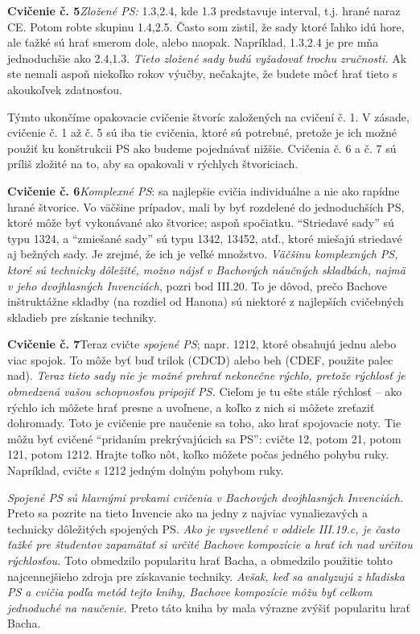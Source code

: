 \textbf{Cvičenie č. 5}\enspace \emph{Zložené PS:} 1.3,2.4, kde 1.3 predstavuje interval, t.j. hrané naraz CE. Potom robte skupinu 1.4,2.5. Často som zistil, že sady ktoré ľahko idú hore, ale ťažké sú hrať smerom dole, alebo naopak. Napríklad, 1.3,2.4 je pre mňa jednoduchšie ako 2.4,1.3. \emph{Tieto zložené sady budú vyžadovať trochu zručnosti.} Ak ste nemali aspoň niekoľko rokov výučby, nečakajte, že budete môcť hrať tieto s akoukoľvek zdatnosťou.

Týmto ukončíme opakovacie cvičenie štvoríc založených na cvičení č. 1. V zásade, cvičenie č. 1 až č. 5 sú iba tie cvičenia, ktoré sú potrebné, pretože je ich možné použiť ku konštrukcii PS ako budeme pojednávať nižšie. Cvičenia č. 6 a č. 7 sú príliš zložité na to, aby sa opakovali v rýchlych štvoriciach.

\textbf{Cvičenie č. 6}\enspace \emph{Komplexné PS}: sa najlepšie cvičia individuálne a nie ako rapídne hrané štvorice. Vo väčšine prípadov, mali by byť rozdelené do jednoduchších PS, ktoré môže byť vykonávané ako štvorice; aspoň spočiatku. “Striedavé sady” sú typu 1324, a “zmiešané sady” sú typu 1342, 13452, atď., ktoré miešajú striedavé aj bežných sady. Je zrejmé, že ich je veľké množstvo. \emph{Väčšinu komplexných PS, ktoré sú technicky dôležité, možno nájsť v Bachových náučných skladbách, najmä v jeho dvojhlasných Invenciách}, pozri bod III.20. To je dôvod, prečo Bachove inštruktážne skladby (na rozdiel od Hanona) sú niektoré z najlepších cvičebných skladieb pre získanie techniky.

\textbf{Cvičenie č. 7}\enspace Teraz cvičte \emph{spojené PS}; napr. 1212, ktoré obsahujú jednu alebo viac spojok. To môže byť buď trilok (CDCD) alebo beh (CDEF, použite palec nad). \emph{Teraz tieto sady nie je možné prehrať nekonečne rýchlo, pretože rýchlosť je obmedzená vašou schopnosťou pripojiť PS.} Cieľom je tu ešte stále rýchlosť -- ako rýchlo ich môžete hrať presne a uvoľnene, a koľko z nich si môžete zreťaziť dohromady. Toto je cvičenie pre naučenie sa toho, ako hrať spojovacie noty. Tie môžu byť cvičené “pridaním prekrývajúcich sa PS”: cvičte 12, potom 21, potom 121, potom 1212. Hrajte toľko nôt, koľko môžete počas jedného pohybu ruky. Napríklad, cvičte s 1212 jedným dolným pohybom ruky.

\emph{Spojené PS sú hlavnými prvkami cvičenia v Bachových dvojhlasných Invenciách.} Preto sa pozrite na tieto Invencie ako na jedny z najviac vynaliezavých a technicky dôležitých spojených PS. \emph{Ako je vysvetlené v oddiele III.19.c, je často ťažké pre študentov zapamätať si určité Bachove kompozície a hrať ich nad určitou rýchlosťou.} Toto obmedzilo popularitu hrať Bacha, a obmedzilo použitie tohto najcennejšieho zdroja pre získavanie techniky. \emph{Avšak, keď sa analyzujú z hľadiska PS a cvičia podľa metód tejto knihy, Bachove kompozície môžu byť celkom jednoduché na naučenie.} Preto táto kniha by mala výrazne zvýšiť popularitu hrať Bacha.

